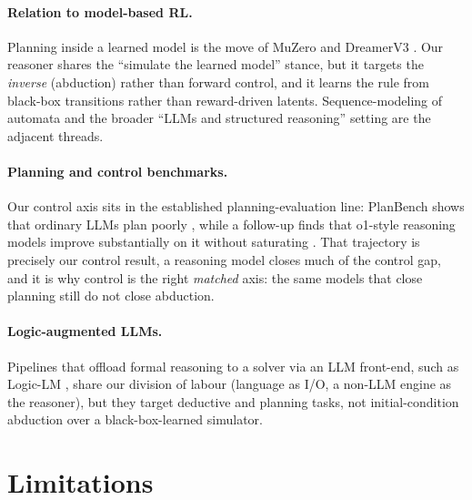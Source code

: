 \documentclass{article}
\begin{document}
\paragraph{Relation to model-based RL.}
Planning inside a learned model is the move of MuZero \cite{muzero} and DreamerV3 \cite{dreamerv3}.
Our reasoner shares the ``simulate the learned model'' stance, but it targets the \emph{inverse}
(abduction) rather than forward control, and it learns the rule from black-box transitions rather than
reward-driven latents. Sequence-modeling of automata \cite{automatagpt} and the broader ``LLMs and
structured reasoning'' setting \cite{illusionthinking} are the adjacent threads.

\paragraph{Planning and control benchmarks.}
Our control axis sits in the established planning-evaluation line: PlanBench shows that ordinary LLMs
plan poorly \cite{planbench}, while a follow-up finds that o1-style reasoning models improve
substantially on it without saturating \cite{o1planbench}. That trajectory is precisely our control
result, a reasoning model closes much of the control gap, and it is why control is the right
\emph{matched} axis: the same models that close planning still do not close abduction.

\paragraph{Logic-augmented LLMs.}
Pipelines that offload formal reasoning to a solver via an LLM front-end, such as Logic-LM
\cite{logiclm}, share our division of labour (language as I/O, a non-LLM engine as the reasoner), but
they target deductive and planning tasks, not initial-condition abduction over a black-box-learned
simulator.

\section{Limitations}
\label{sec:limitations}
\end{document}
